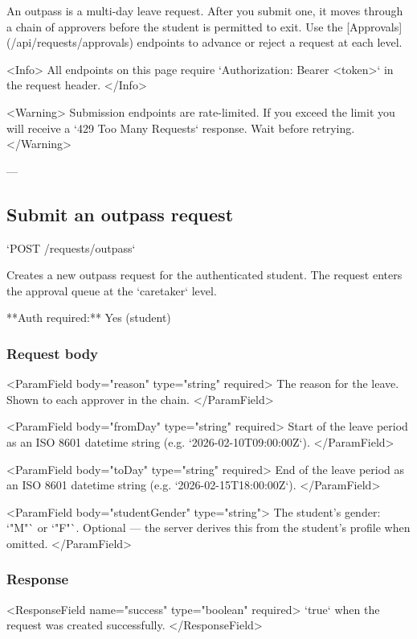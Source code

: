 


An outpass is a multi-day leave request. After you submit one, it moves through a chain of approvers before the student is permitted to exit. Use the [Approvals](/api/requests/approvals) endpoints to advance or reject a request at each level.

<Info>
  All endpoints on this page require `Authorization: Bearer <token>` in the request header.
</Info>

<Warning>
  Submission endpoints are rate-limited. If you exceed the limit you will
  receive a `429 Too Many Requests` response. Wait before retrying.
</Warning>

---

\subsection{Submit an outpass request}

`POST /requests/outpass`

Creates a new outpass request for the authenticated student. The request enters the approval queue at the `caretaker` level.

**Auth required:** Yes (student)

\subsubsection{Request body}

<ParamField body="reason" type="string" required>
  The reason for the leave. Shown to each approver in the chain.
</ParamField>

<ParamField body="fromDay" type="string" required>
  Start of the leave period as an ISO 8601 datetime string (e.g.
  `2026-02-10T09:00:00Z`).
</ParamField>

<ParamField body="toDay" type="string" required>
  End of the leave period as an ISO 8601 datetime string (e.g.
  `2026-02-15T18:00:00Z`).
</ParamField>

<ParamField body="studentGender" type="string">
  The student's gender: `"M"` or `"F"`. Optional — the server derives this from
  the student's profile when omitted.
</ParamField>

\subsubsection{Response}

<ResponseField name="success" type="boolean" required>
  `true` when the request was created successfully.
</ResponseField>

